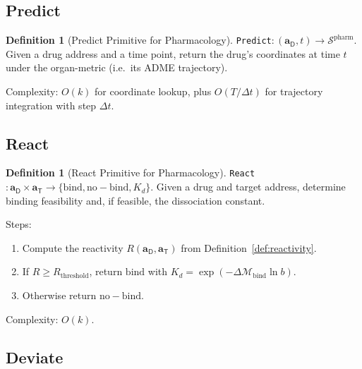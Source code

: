 \documentclass[11pt,twocolumn,a4paper]{article}
\theoremstyle{definition}
\newtheorem{definition}[theorem]{Definition}
\theoremstyle{remark}
\newcommand{\Sspace}{\mathcal{S}}
\newcommand{\Depth}{\mathcal{M}}
\newcommand{\Drug}{\mathsf{D}}
\newcommand{\Target}{\mathsf{T}}
\newcommand{\drugaddr}{\mathbf{a}_\Drug}
\newcommand{\targaddr}{\mathbf{a}_\Target}
\begin{document}
\subsection{Predict}

\begin{definition}[Predict Primitive for Pharmacology]
\label{def:predict_pharm}
\texttt{Predict}$: (\drugaddr, t) \to \Sspace^{\mathrm{pharm}}$. Given a drug address and a time point, return the drug's coordinates at time $t$ under the organ-metric (i.e.\ its ADME trajectory).

Complexity: $O(k)$ for coordinate lookup, plus $O(T/\Delta t)$ for trajectory integration with step $\Delta t$.
\end{definition}

\subsection{React}
\label{sec:react_pharm}

\begin{definition}[React Primitive for Pharmacology]
\label{def:react_pharm}
\texttt{React}$: \drugaddr \times \targaddr \to \{\mathrm{bind}, \mathrm{no-bind}, K_d\}$. Given a drug and target address, determine binding feasibility and, if feasible, the dissociation constant.

Steps:
\begin{enumerate}[nosep,label=(\alph*)]
\item Compute the reactivity $R(\drugaddr, \targaddr)$ from Definition~\ref{def:reactivity}.
\item If $R \geq R_{\mathrm{threshold}}$, return $\mathrm{bind}$ with $K_d = \exp(-\Delta\Depth_{\mathrm{bind}} \ln b)$.
\item Otherwise return $\mathrm{no-bind}$.
\end{enumerate}

Complexity: $O(k)$.
\end{definition}

\subsection{Deviate}
\end{document}
